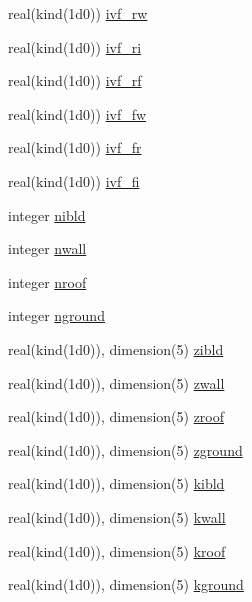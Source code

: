 \begin{DoxyCompactItemize}
\item 
real(kind(1d0)) \hyperlink{namespaceestm__data_ad040589ab34bca345b5bc4004048bed1}{ivf\+\_\+rw}
\item 
real(kind(1d0)) \hyperlink{namespaceestm__data_a15423f952e1c9866ae15180ff4e08244}{ivf\+\_\+ri}
\item 
real(kind(1d0)) \hyperlink{namespaceestm__data_a3353758e0f87a694352d364605c265cd}{ivf\+\_\+rf}
\item 
real(kind(1d0)) \hyperlink{namespaceestm__data_a8076ec4c1665548b2e7641b569e39efc}{ivf\+\_\+fw}
\item 
real(kind(1d0)) \hyperlink{namespaceestm__data_a446124d1b0c7c3982f913863e8b118ac}{ivf\+\_\+fr}
\item 
real(kind(1d0)) \hyperlink{namespaceestm__data_aa3243d478e5262855b7f5a1eefdf2ab7}{ivf\+\_\+fi}
\item 
integer \hyperlink{namespaceestm__data_a2c79bef2a37b73c20e9e9531cc84f2a2}{nibld}
\item 
integer \hyperlink{namespaceestm__data_a736fcc4e8ebcaaebce24ee35abc0914e}{nwall}
\item 
integer \hyperlink{namespaceestm__data_a1510b42e476421a5d5e5bf62fcf78173}{nroof}
\item 
integer \hyperlink{namespaceestm__data_aa85aac6c0317e29416f627b48f11fb51}{nground}
\item 
real(kind(1d0)), dimension(5) \hyperlink{namespaceestm__data_a6268c5a8d9d7a6835ad2906f53730588}{zibld}
\item 
real(kind(1d0)), dimension(5) \hyperlink{namespaceestm__data_add3c8dfcc5a6e9e0a8aa1f9a6d88a50c}{zwall}
\item 
real(kind(1d0)), dimension(5) \hyperlink{namespaceestm__data_af768a9da8007b24ee18243e681fb9fa7}{zroof}
\item 
real(kind(1d0)), dimension(5) \hyperlink{namespaceestm__data_a0cf74171fd4626303e99a6ef657ae1c3}{zground}
\item 
real(kind(1d0)), dimension(5) \hyperlink{namespaceestm__data_ad62e9580ef44ce102500c1a5db394ca4}{kibld}
\item 
real(kind(1d0)), dimension(5) \hyperlink{namespaceestm__data_a47c95a7ea355103f96297323577342aa}{kwall}
\item 
real(kind(1d0)), dimension(5) \hyperlink{namespaceestm__data_a4a6dc37f5a42699f54da6bd130191c07}{kroof}
\item 
real(kind(1d0)), dimension(5) \hyperlink{namespaceestm__data_a4bc69fd9c3630659ed7aa78ab5218b3e}{kground}
\item 

\end{DoxyCompactItemize}
